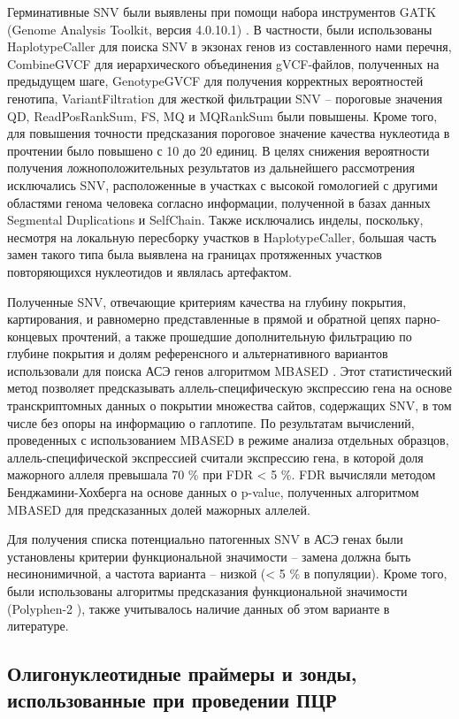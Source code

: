 Герминативные SNV были выявлены  при помощи набора инструментов GATK (Genome Analysis Toolkit, версия 4.0.10.1) \cite{mckenna_genome_2010}. В частности, были использованы HaplotypeCaller для поиска SNV в экзонах генов из составленного нами перечня, CombineGVCF для иерархического объединения gVCF-файлов, полученных на предыдущем шаге, GenotypeGVCF для получения корректных вероятностей генотипа, VariantFiltration для жесткой фильтрации SNV – пороговые значения QD, ReadPosRankSum, FS, MQ и MQRankSum были повышены. Кроме того, для повышения точности предсказания пороговое значение качества нуклеотида в прочтении было повышено с 10 до 20 единиц. В целях снижения вероятности получения ложноположительных результатов из дальнейшего рассмотрения исключались SNV, расположенные в участках с высокой гомологией с другими областями генома человека согласно информации, полученной в базах данных Segmental Duplications и SelfChain. Также исключались инделы, поскольку, несмотря на локальную пересборку участков в HaplotypeCaller, большая часть замен такого типа была выявлена на границах протяженных участков повторяющихся нуклеотидов и являлась артефактом.

Полученные SNV, отвечающие критериям качества на глубину покрытия, картирования, и равномерно представленные в прямой и обратной цепях парно-концевых прочтений, а также прошедшие дополнительную фильтрацию по глубине покрытия и долям референсного и альтернативного вариантов использовали для поиска АСЭ генов алгоритмом MBASED \cite{mayba_mbased:_2014}. Этот статистический метод позволяет предсказывать аллель-специфическую экспрессию гена на основе транскриптомных данных о покрытии множества сайтов, содержащих SNV, в том числе без опоры на информацию о гаплотипе. По результатам вычислений, проведенных с использованием MBASED в режиме анализа отдельных образцов, аллель-специфической экспрессией считали экспрессию гена, в которой доля мажорного аллеля превышала 70 \% при FDR < 5 \%. FDR вычисляли методом Бенджамини-Хохберга на основе данных о p-value, полученных алгоритмом MBASED для предсказанных долей мажорных аллелей.

Для получения списка потенциально патогенных SNV в АСЭ генах были установлены критерии функциональной значимости – замена должна быть несинонимичной, а частота варианта – низкой (< 5 \% в популяции). Кроме того, были использованы алгоритмы предсказания функциональной значимости (Polyphen-2 \cite{adzhubei_predicting_2013}), также учитывалось наличие данных об этом варианте в литературе.

\subsection{Олигонуклеотидные праймеры и зонды, использованные при проведении ПЦР}


